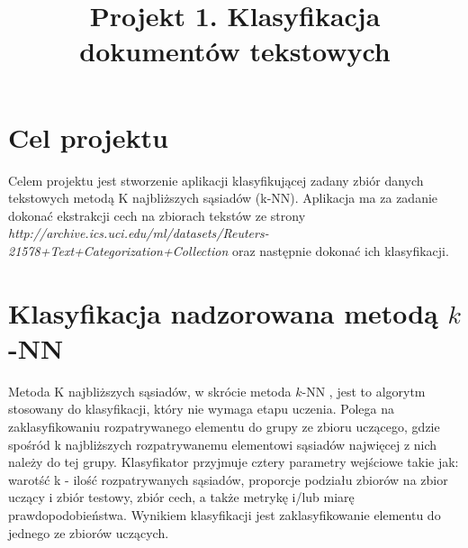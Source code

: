 \documentclass{classrep}
\author{
  \studentinfo{Julia Szymańska}{224441} \and
  \studentinfo{Przemysław Zdrzalik}{224466} }
\title{Projekt 1. Klasyfikacja dokumentów tekstowych}
\begin{document}
\maketitle


\section{Cel projektu}
Celem projektu jest stworzenie aplikacji klasyfikującej zadany zbiór danych tekstowych metodą K najbliższych sąsiadów (k-NN). Aplikacja ma za zadanie dokonać ekstrakcji cech na zbiorach tekstów ze strony \\\textit{http://archive.ics.uci.edu/ml/datasets/Reuters-21578+Text+Categorization+Collection} oraz następnie dokonać ich klasyfikacji.\\


\section{Klasyfikacja nadzorowana metodą $k$-NN}


Metoda K najbliższych sąsiadów, w skrócie metoda $k$-NN \cite{dane}, jest to algorytm stosowany do klasyfikacji, który nie wymaga etapu uczenia. 
Polega na zaklasyfikowaniu rozpatrywanego elementu do grupy ze zbioru uczącego, gdzie spośród k najbliższych rozpatrywanemu elementowi sąsiadów najwięcej z nich należy do tej grupy. Klasyfikator przyjmuje cztery parametry wejściowe takie jak: warotść k - ilość rozpatrywanych sąsiadów, proporcje podziału zbiorów na zbior uczący i zbiór testowy, zbiór cech, a także metrykę i/lub miarę prawdopodobieństwa. Wynikiem klasyfikacji jest zaklasyfikowanie elementu do jednego ze zbiorów uczących. 
\end{document}
